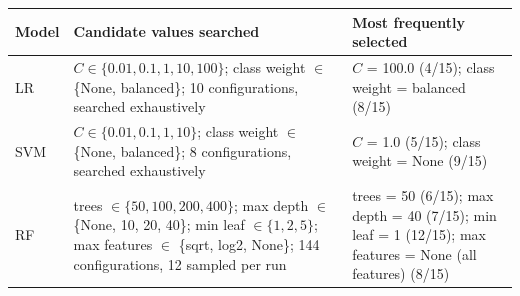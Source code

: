 \begin{tabularx}{\linewidth}{@{}l X X@{}}
\toprule
\textbf{Model} & \textbf{Candidate values searched} & \textbf{Most frequently selected} \\
\midrule
LR & $C \in \{0.01, 0.1, 1, 10, 100\}$; class weight $\in$ \{None, balanced\}; 10 configurations, searched exhaustively & $C$ = 100.0 (4/15); class weight = balanced (8/15) \\
SVM & $C \in \{0.01, 0.1, 1, 10\}$; class weight $\in$ \{None, balanced\}; 8 configurations, searched exhaustively & $C$ = 1.0 (5/15); class weight = None (9/15) \\
RF & trees $\in \{50, 100, 200, 400\}$; max depth $\in$ \{None, 10, 20, 40\}; min leaf $\in \{1, 2, 5\}$; max features $\in$ \{sqrt, log2, None\}; 144 configurations, 12 sampled per run & trees = 50 (6/15); max depth = 40 (7/15); min leaf = 1 (12/15); max features = None (all features) (8/15) \\
\bottomrule
\end{tabularx}
